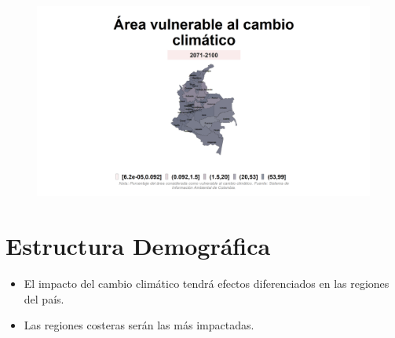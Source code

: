     \begin{figure}[H]
        \caption[Área vulnerable al cambio climático por departamentos ]{\label{cambio_climatico_dptos} }
        \begin{center}
        \includegraphics[width=\textwidth,keepaspectratio]{img/var_299_map.png}
        \end{center}
    \end{figure}


\section{Estructura Demográfica}

    \begin{tcolorbox}[enhanced, colback=mycolor,colframe=mycolor,drop fuzzy shadow,watermark color=white,
                        title=Principales Resultados]
    
            \begin{itemize}
                    \item El impacto del cambio climático tendrá efectos diferenciados en las regiones del país.
                    \item Las regiones costeras serán las más impactadas.
            \end{itemize}
     
    \end{tcolorbox}

